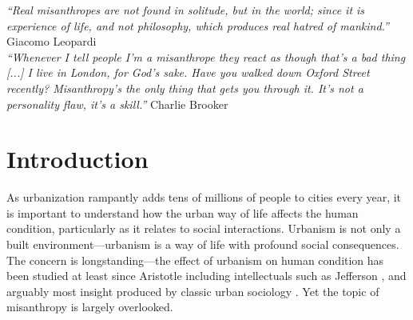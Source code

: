 \documentclass[11pt, letterpaper]{article}
\newcommand{\emd}[1]{\ExecuteMetaData[/tmp/tex]{#1}} %
\begin{document}

\begin{spacing}{1.4} %
\vspace{.25in}


{\small\it \noindent ``Real misanthropes are not found in solitude, but in the world; since it is experience of life, and not philosophy, which produces real hatred of mankind.''} Giacomo Leopardi\\

{\small\it \noindent ``Whenever I tell people I'm a misanthrope they react as
  though that's a bad thing [...] I live in London, for God's sake. Have you
  walked down Oxford Street recently? Misanthropy's the only thing that gets you
  through it. It's not a personality flaw, it's a skill.''} Charlie Brooker\\


\newpage

\section*{Introduction}

\noindent As urbanization rampantly adds tens of millions of people to cities every year,
it is important to understand how the urban way of life affects the human condition,
particularly as it relates to social interactions.
 Urbanism is not only a built environment---urbanism is a way of life with
 profound social consequences. 
  The concern is longstanding---the effect of urbanism on human condition has
  been studied at least since Aristotle \citep{jowett1920aristotle} including
   intellectuals such as Jefferson \citep{white77}, and arguably most
  insight produced by classic urban sociology
  \citep{wirth38,tonnies57,simmel03}. Yet the topic of misanthropy is largely
  overlooked. 


\end{spacing}
\end{document}
